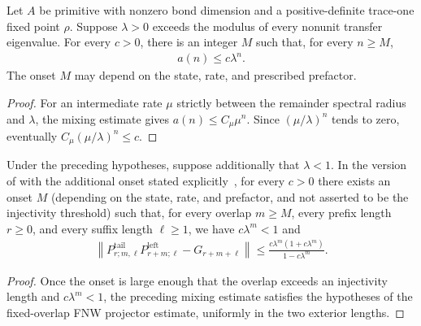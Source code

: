 \begin{lemma}
    \label{thm:fnw-eventual-prescribed-prefactor}
    \leanok
    Let $A$ be primitive with nonzero bond dimension and a positive-definite
    trace-one fixed point $\rho$. Suppose $\lambda>0$ exceeds the modulus
    of every nonunit transfer eigenvalue. For every $c>0$, there is an integer
    $M$ such that, for every $n\geq M$,
    \begin{align}
        a(n)\leq c\lambda^n.
    \end{align}
    The onset $M$ may depend on the state, rate, and prescribed prefactor.
\end{lemma}
\begin{proof}\leanok
    For an intermediate rate $\mu$ strictly between the remainder spectral
    radius and $\lambda$, the mixing estimate gives $a(n)\leq C_\mu\mu^n$.
    Since $(\mu/\lambda)^n$ tends to zero, eventually
    $C_\mu(\mu/\lambda)^n\leq c$.
\end{proof}

\begin{lemma}
    \label{thm:fnw-eventual-projector-prescribed-prefactor}
    \leanok
    Under the preceding hypotheses, suppose additionally that $\lambda<1$.
    In the version of \cite[Section~6, equation~(6.1)]{Nachtergaele1996Spectral}
    with the additional onset stated
    explicitly~\cite{gap:cpgsv21_martingale_overlap}, for every $c>0$ there
    exists an onset $M$ (depending on the state, rate, and prefactor, and not
    asserted to be the injectivity threshold) such that, for every overlap
    $m\geq M$, every prefix length $r\geq0$, and every suffix length $\ell\geq1$,
    we have $c\lambda^m<1$ and
    \begin{align}
        \left\|P^{\mathrm{tail}}_{r;m,\ell}P^{\mathrm{left}}_{r+m;\ell}
        -G_{r+m+\ell}\right\|
        \leq \frac{c\lambda^m(1+c\lambda^m)}{1-c\lambda^m}.
    \end{align}
\end{lemma}
\begin{proof}\leanok
    Once the onset is large enough that the overlap exceeds an injectivity
    length and $c\lambda^m<1$, the preceding mixing estimate satisfies the
    hypotheses of the fixed-overlap FNW projector estimate, uniformly in the
    two exterior lengths.
\end{proof}


